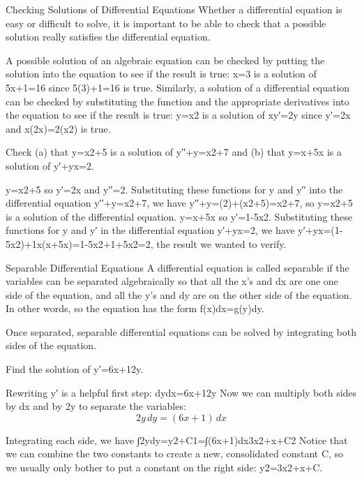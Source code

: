 Checking Solutions of Differential Equations
Whether a differential equation is easy or difficult to solve, it is important to be able to check that a possible solution really satisfies the differential equation.

A possible solution of an algebraic equation can be checked by putting the solution into the equation to see if the result is true: x=3 is a solution of 5x+1=16 since 5(3)+1=16 is true. Similarly, a solution of a differential equation can be checked by substituting the function and the appropriate derivatives into the equation to see if the result is true: y=x2 is a solution of xy′=2y since y′=2x and x(2x)=2(x2) is true.

\begin{example}
Check (a) that y=x2+5 is a solution of y′′+y=x2+7 and (b) that y=x+5x is a solution of y′+yx=2.

\begin{solution}
  y=x2+5 so y′=2x and y′′=2. Substituting these functions for y and y′′ into the differential equation y′′+y=x2+7, we have
y′′+y=(2)+(x2+5)=x2+7,
so y=x2+5 is a solution of the differential equation.
y=x+5x so y′=1-5x2. Substituting these functions for y and y′ in the differential equation y′+yx=2, we have
y′+yx=(1-5x2)+1x(x+5x)=1-5x2+1+5x2=2,
the result we wanted to verify.
\end{solution}\end{example}

Separable Differential Equations
A differential equation is called separable if the variables can be separated algebraically so that all the x's and dx are one one side of the equation, and all the y's and dy are on the other side of the equation. In other words, so the equation has the form f(x)dx=g(y)dy.

Once separated, separable differential equations can be solved by integrating both sides of the equation.

\begin{example}
Find the solution of
y′=6x+12y.

\begin{solution}
  Rewriting y′ is a helpful first step:
dydx=6x+12y
Now we can multiply both sides by dx and by 2y to separate the variables: \[ 2y\, dy=(6x+1)\, dx\]

Integrating each side, we have
∫2ydy=y2+C1=∫(6x+1)dx3x2+x+C2
Notice that we can combine the two constants to create a new, consolidated constant C, so we usually only bother to put a constant on the right side:
y2=3x2+x+C.
\end{solution}\end{example}

